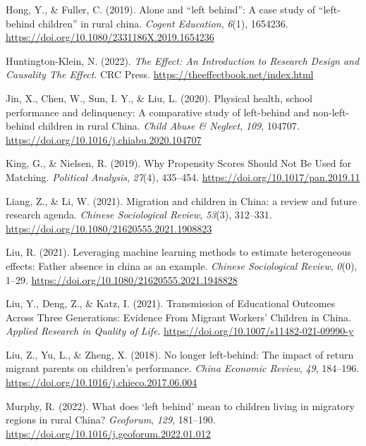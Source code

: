 \documentclass[
  man,floatsintext]{apa7}
\newlength{\cslhangindent}
\newlength{\cslentryspacingunit} %
\newenvironment{CSLReferences}[2] %
 {%
  \setlength{\parindent}{0pt}
  \ifodd #1
  \let\oldpar\par
  \def\par{\hangindent=\cslhangindent\oldpar}
  \fi
  \setlength{\parskip}{#2\cslentryspacingunit}
 }%
 {}
\begin{document}
\begin{CSLReferences}{1}{0}
\leavevmode{}%
Hong, Y., \& Fuller, C. (2019). Alone and {``}left behind{''}: A case study of {``}left-behind children{''} in rural china. \emph{Cogent Education}, \emph{6}(1), 1654236. \url{https://doi.org/10.1080/2331186X.2019.1654236}

\leavevmode{}%
Huntington-Klein, N. (2022). \emph{The Effect: An Introduction to Research Design and Causality \textbar{} The Effect}. CRC Press. \url{https://theeffectbook.net/index.html}

\leavevmode{}%
Jin, X., Chen, W., Sun, I. Y., \& Liu, L. (2020). Physical health, school performance and delinquency: A comparative study of left-behind and non-left-behind children in rural China. \emph{Child Abuse \& Neglect}, \emph{109}, 104707. \url{https://doi.org/10.1016/j.chiabu.2020.104707}

\leavevmode{}%
King, G., \& Nielsen, R. (2019). Why Propensity Scores Should Not Be Used for Matching. \emph{Political Analysis}, \emph{27}(4), 435--454. \url{https://doi.org/10.1017/pan.2019.11}

\leavevmode{}%
Liang, Z., \& Li, W. (2021). Migration and children in China: a review and future research agenda. \emph{Chinese Sociological Review}, \emph{53}(3), 312--331. \url{https://doi.org/10.1080/21620555.2021.1908823}

\leavevmode{}%
Liu, R. (2021). Leveraging machine learning methods to estimate heterogeneous effects: Father absence in china as an example. \emph{Chinese Sociological Review}, \emph{0}(0), 1--29. \url{https://doi.org/10.1080/21620555.2021.1948828}

\leavevmode{}%
Liu, Y., Deng, Z., \& Katz, I. (2021). Transmission of Educational Outcomes Across Three Generations: Evidence From Migrant Workers{'} Children in China. \emph{Applied Research in Quality of Life}. \url{https://doi.org/10.1007/s11482-021-09990-y}

\leavevmode{}%
Liu, Z., Yu, L., \& Zheng, X. (2018). No longer left-behind: The impact of return migrant parents on children's performance. \emph{China Economic Review}, \emph{49}, 184--196. \url{https://doi.org/10.1016/j.chieco.2017.06.004}

\leavevmode{}%
Murphy, R. (2022). What does {`}left behind{'} mean to children living in migratory regions in rural China? \emph{Geoforum}, \emph{129}, 181--190. \url{https://doi.org/10.1016/j.geoforum.2022.01.012}


\end{CSLReferences}
\end{document}
